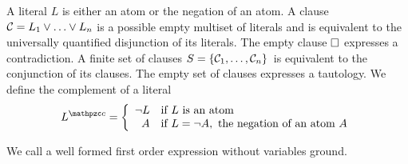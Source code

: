 
\begin{definition}\label{def:literals}
A {\myem literal} $L$ is either an atom or the negation of an atom.
%
A {\myem clause}\ \ ${\mathcal C} = L_1\lor\ldots\lor L_n$  is a possible empty multiset of literals 
and is equivalent to the universally quantified disjunction of its literals.
The {\myem empty clause} $\square$ expresses a contradiction. 
%
A finite {\myem set of clauses} $S=\{ {\mathcal C}_1,\ldots,{\mathcal C}_n \}$ is equivalent to the conjunction of its clauses.
The empty set of clauses expresses a tautology.
%
We define the {\myem complement }of a literal 
\[
L^\mcc = \left\{
\begin{array}{rl}
\lnot L & \text{if } L \text{ is an atom} \\
A 	& \text{if }L = \lnot A, \text{ the negation of an atom } A
\end{array}
\right.
\]
\end{definition}

\begin{definition}
	We call a well formed first order expression without variables {\myem ground}.
\end{definition}

